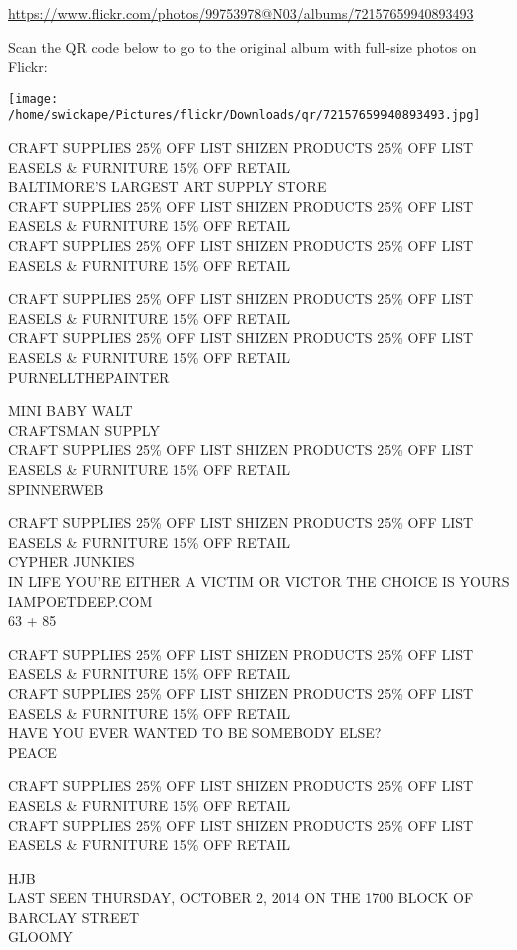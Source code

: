 \documentclass[10pt,letterpaper]{article}
\begin{document}
\url{https://www.flickr.com/photos/99753978@N03/albums/72157659940893493}

Scan the QR code below to go to the original album with full-size photos on Flickr:

\texttt{[image: /home/swickape/Pictures/flickr/Downloads/qr/72157659940893493.jpg]}
\pagebreak

CRAFT SUPPLIES 25\% OFF LIST SHIZEN PRODUCTS 25\% OFF LIST EASELS \& FURNITURE 15\% OFF RETAIL\\
BALTIMORE'S LARGEST ART SUPPLY STORE\\
CRAFT SUPPLIES 25\% OFF LIST SHIZEN PRODUCTS 25\% OFF LIST EASELS \& FURNITURE 15\% OFF RETAIL\\
CRAFT SUPPLIES 25\% OFF LIST SHIZEN PRODUCTS 25\% OFF LIST EASELS \& FURNITURE 15\% OFF RETAIL

CRAFT SUPPLIES 25\% OFF LIST SHIZEN PRODUCTS 25\% OFF LIST EASELS \& FURNITURE 15\% OFF RETAIL\\
CRAFT SUPPLIES 25\% OFF LIST SHIZEN PRODUCTS 25\% OFF LIST EASELS \& FURNITURE 15\% OFF RETAIL\\
PURNELLTHEPAINTER

MINI BABY WALT\\
CRAFTSMAN SUPPLY\\
CRAFT SUPPLIES 25\% OFF LIST SHIZEN PRODUCTS 25\% OFF LIST EASELS \& FURNITURE 15\% OFF RETAIL\\
SPINNERWEB

CRAFT SUPPLIES 25\% OFF LIST SHIZEN PRODUCTS 25\% OFF LIST EASELS \& FURNITURE 15\% OFF RETAIL\\
CYPHER JUNKIES\\
IN LIFE YOU'RE EITHER A VICTIM OR VICTOR THE CHOICE IS YOURS IAMPOETDEEP.COM\\
63 + 85

CRAFT SUPPLIES 25\% OFF LIST SHIZEN PRODUCTS 25\% OFF LIST EASELS \& FURNITURE 15\% OFF RETAIL\\
CRAFT SUPPLIES 25\% OFF LIST SHIZEN PRODUCTS 25\% OFF LIST EASELS \& FURNITURE 15\% OFF RETAIL\\
HAVE YOU EVER WANTED TO BE SOMEBODY ELSE?\\
PEACE

CRAFT SUPPLIES 25\% OFF LIST SHIZEN PRODUCTS 25\% OFF LIST EASELS \& FURNITURE 15\% OFF RETAIL\\
CRAFT SUPPLIES 25\% OFF LIST SHIZEN PRODUCTS 25\% OFF LIST EASELS \& FURNITURE 15\% OFF RETAIL

HJB\\
LAST SEEN THURSDAY, OCTOBER 2, 2014 ON THE 1700 BLOCK OF BARCLAY STREET\\
GLOOMY
\end{document}
